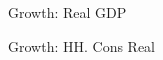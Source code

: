 \documentclass{article}
\begin{document}
 
\begin{figure}[htbp]
\centering
\resizebox{\textwidth}{!}{}
\caption{Growth: Real GDP}
\end{figure}

 
\begin{figure}[htbp]
\centering
\resizebox{\textwidth}{!}{}
\caption{Growth: HH. Cons Real}
\end{figure}
\end{document}
